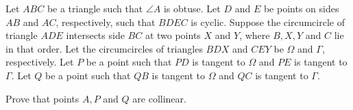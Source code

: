Let $ABC$ be a triangle such that $\angle A$ is obtuse. Let $D$ and $E$ be points on sides $AB$ and $AC$, respectively, such that $BDEC$ is cyclic. Suppose the circumcircle of triangle $ADE$ intersects side $BC$ at two points $X$ and $Y$, where $B,X,Y$ and $C$ lie in that order. Let the circumcircles of triangles $BDX$ and $CEY$ be $\Omega$ and $\Gamma$, respectively. Let $P$ be a point such that $PD$ is tangent to $\Omega$ and $PE$ is tangent to $\Gamma$. Let $Q$ be a point such that $QB$ is tangent to $\Omega$ and $QC$ is tangent to $\Gamma$.

Prove that points $A,P$ and $Q$ are collinear.
